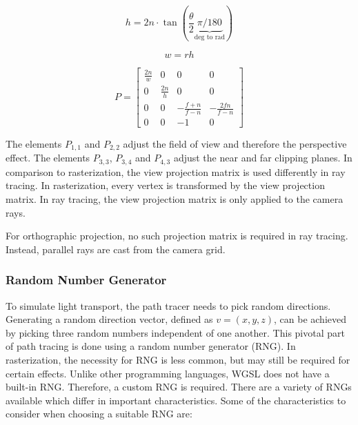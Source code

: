 \begin{equation}
    \label{eqn:perspectiveProjectionHeight}
    h = 2n \cdot \tan(\frac{\theta}{2} \underbrace{\pi / 180}_{\text{deg to rad}})
\end{equation}

\begin{equation}
    \label{eqn:perspectiveProjectionWidth}
    w = rh
\end{equation}

\begin{equation}
    \label{eqn:perspectiveProjectionMatrix}
    P = 
    \begin{bmatrix}
        \frac{2n}{w} & 0 & 0 & 0 \\
        0 & \frac{2n}{h} & 0 & 0 \\
        0 & 0 & -\frac{f + n}{f - n} & -\frac{2fn}{f - n} \\
        0 & 0 & -1 & 0
    \end{bmatrix}
\end{equation}

The elements $P_{1,1}$ and $P_{2,2}$ adjust the field of view and therefore the perspective effect. The elements $P_{3,3}$, $P_{3,4}$ and $P_{4,3}$ adjust the near and far clipping planes. In comparison to rasterization, the view projection matrix is used differently in ray tracing. In rasterization, every vertex is transformed by the view projection matrix. In ray tracing, the view projection matrix is only applied to the camera rays.

For orthographic projection, no such projection matrix is required in ray tracing. Instead, parallel rays are cast from the camera grid.

\subsubsection{Random Number Generator}
  
To simulate light transport, the path tracer needs to pick random directions. Generating a random direction vector, defined as $v = (x, y, z)$, can be achieved by picking three random numbers independent of one another. This pivotal part of path tracing is done using a random number generator (\gls{RNG}). In rasterization, the necessity for \gls{RNG} is less common, but may still be required for certain effects. Unlike other programming languages, \gls{WGSL} does not have a built-in \gls{RNG}. Therefore, a custom \gls{RNG} is required. There are a variety of \glspl{RNG} available which differ in important characteristics. Some of the characteristics to consider when choosing a suitable \gls{RNG} are:

